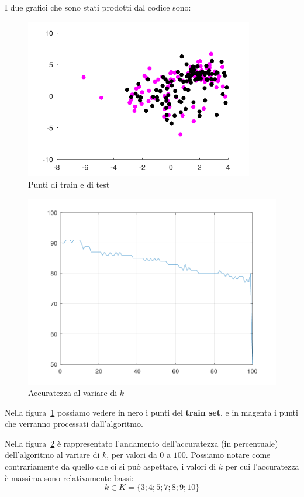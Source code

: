 \documentclass[a4paper]{article}
\begin{document}
I due grafici che sono stati prodotti dal codice sono:
\begin{figure}
\centering
\includegraphics[width=10cm]{punti}
\caption{Punti di train e di test}
\label{fig:punti}
\end{figure}
\begin{figure}
\centering
\includegraphics[width=12cm]{accuratezza}
\caption{Accuratezza al variare di $k$}
\label{fig:acc}
\end{figure}

Nella figura~\ref{fig:punti} possiamo vedere in nero i punti del \textbf{train set}, e in magenta i punti che verranno processati dall'algoritmo.

Nella figura~\ref{fig:acc} è rappresentato l'andamento dell'accuratezza (in percentuale) dell'algoritmo al variare di $k$, per valori da $0$ a $100$. Possiamo notare come contrariamente da quello che ci si può aspettare, i valori di $k$ per cui l'accuratezza è massima sono relativamente bassi:
\[
k \in K = \{3; 4; 5; 7; 8; 9; 10\}
\]
\end{document}
